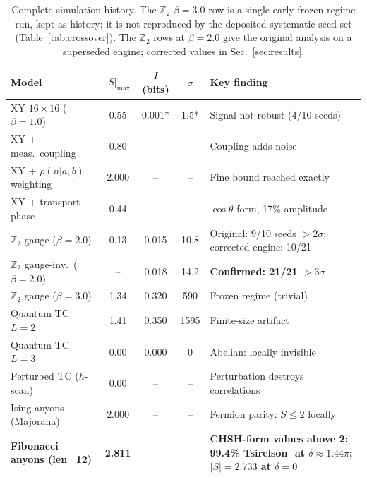 \documentclass[aps,pra,twocolumn,superscriptaddress,showpacs,floatfix]{revtex4-2}
\newcommand{\Ztwo}{\mathbb{Z}_2}
\begin{document}
\begin{table}[h]
\caption{Complete simulation history. The $\Ztwo$ $\beta{=}3.0$ row is a single early frozen-regime run, kept as history; it is not reproduced by the deposited systematic seed set (Table~\ref{tab:crossover}). The $\Ztwo$ rows at $\beta{=}2.0$ give the original analysis on a superseded engine; corrected values in Sec.~\ref{sec:results}.}
\label{tab:history}
\begin{ruledtabular}
\begin{tabular}{lcccl}
Model & $|S|_\mathrm{max}$ & $I$ (bits) & $\sigma$ & Key finding \\
\midrule
XY $16{\times}16$ ($\beta{=}1.0$) & 0.55 & 0.001* & 1.5* & \parbox[t]{5.5cm}{\raggedright Signal not robust (4/10 seeds)} \\
XY + meas.\ coupling         & 0.80 & --    & --   & \parbox[t]{5.5cm}{\raggedright Coupling adds noise} \\
XY + $\rho(n|a,b)$ weighting & 2.000 & --   & --   & \parbox[t]{5.5cm}{\raggedright Fine bound reached exactly} \\
XY + transport phase          & 0.44 & --    & --   & \parbox[t]{5.5cm}{\raggedright $\cos\theta$ form, 17\% amplitude} \\
$\Ztwo$ gauge ($\beta{=}2.0$)  & 0.13 & 0.015 & 10.8 & \parbox[t]{5.5cm}{\raggedright Original: 9/10 seeds ${>}2\sigma$; corrected engine: 10/21} \\
$\Ztwo$ gauge-inv.\ ($\beta{=}2.0$) & -- & 0.018 & 14.2 & \parbox[t]{5.5cm}{\raggedright \textbf{Confirmed: 21/21 ${>}3\sigma$}} \\
$\Ztwo$ gauge ($\beta{=}3.0$)  & 1.34 & 0.320 & 590  & \parbox[t]{5.5cm}{\raggedright Frozen regime (trivial)} \\
Quantum TC $L{=}2$            & 1.41 & 0.350 & 1595 & \parbox[t]{5.5cm}{\raggedright Finite-size artifact} \\
Quantum TC $L{=}3$            & 0.00 & 0.000 & 0    & \parbox[t]{5.5cm}{\raggedright Abelian: locally invisible} \\
Perturbed TC ($h$-scan)        & 0.00 & --    & --   & \parbox[t]{5.5cm}{\raggedright Perturbation destroys correlations} \\
Ising anyons (Majorana)        & 2.000 & --   & --   & \parbox[t]{5.5cm}{\raggedright Fermion parity: $S{\leq}2$ locally} \\
\textbf{Fibonacci anyons (len=12)} & \textbf{2.811} & -- & -- & \parbox[t]{5.5cm}{\raggedright \textbf{CHSH-form values above 2: 99.4\% Tsirelson$^\dagger$ at $\delta{\approx}1.44\pi$; $|S|=2.733$ at $\delta{=}0$}} \\
\end{tabular}
\end{ruledtabular}
\end{table}
\end{document}
